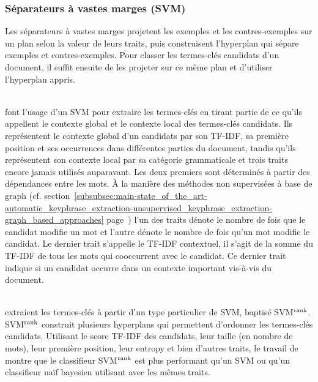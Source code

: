       \subsubsection{Séparateurs à vastes marges (SVM)}
      \label{subsubsec:main-state_of_the_art-automatic_keyphrase_extraction-supervised_keyphrase_extraction-svms}
        Les séparateurs à vastes marges projetent les exemples et les
        contres-exemples sur un plan selon la valeur de leurs traits, puis
        construisent l'hyperplan qui sépare exemples et contres-exemples. Pour
        classer les termes-clés candidats d'un document, il suffit ensuite de
        les projeter sur ce même plan et d'utiliser l'hyperplan appris.

        ~\\ font l'usage d'un SVM pour extraire les
        termes-clés en tirant partie de ce qu'ils appellent le contexte global
        et le contexte local des termes-clés candidats. Ils représentent le
        contexte global d'un candidats par son TF-IDF, sa première position et
        ses occurrences dans différentes parties du document, tandis qu'ils
        représentent son contexte local par sa catégorie grammaticale et trois
        traits encore jamais utilisés auparavant. Les deux premiers sont
        déterminés à partir des dépendances entre les mots. À la manière des
        méthodes non supervisées à base de graph (cf.
        section~\ref{subsubsec:main-state_of_the_art-automatic_keyphrase_extraction-unsupervised_keyphrase_extraction-graph_based_approaches}
        page~\pageref{subsubsec:main-state_of_the_art-automatic_keyphrase_extraction-unsupervised_keyphrase_extraction-graph_based_approaches})
        l'un des traits dénote le nombre de fois que le candidat modifie un mot
        et l'autre dénote le nombre de fois qu'un mot modifie le candidat. Le
        dernier trait s'appelle le TF-IDF contextuel, il s'agit de la somme du
        TF-IDF de tous les mots qui cooccurrent avec le candidat. Ce dernier
        trait indique si un candidat occurre dans un contexte important
        vis-à-vis du document.

        ~\\ extraient les termes-clés à partir d'un
        type particulier de SVM, baptisé SVM$^\textnormal{rank}$.
        SVM$^\textnormal{rank}$ construit plusieurs hyperplans qui permettent
        d'ordonner les termes-clés candidats. Utilisant le score TF-IDF des
        candidats, leur taille (en nombre de mots), leur première position, leur
        entropy et bien d'autres traits, le travail de
         montre que le classifieur
        SVM$^\textnormal{rank}$ est plus performant qu'un SVM ou qu'un
        classifieur naïf bayesien utilisant avec les mêmes traits.

